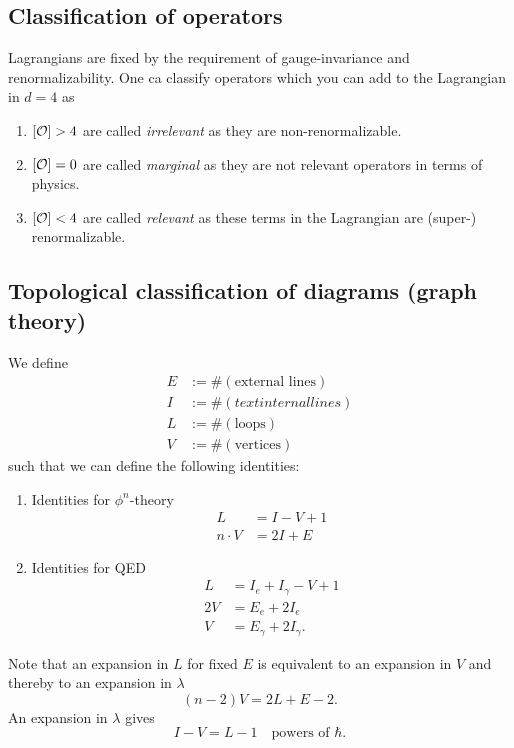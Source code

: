 \subsection{Classification of operators}
Lagrangians are fixed by the requirement of gauge-invariance and renormalizability. One ca classify operators which you can add to the Lagrangian in $d=4$ as
\begin{enumerate}
	\item $[\mathcal{O}] >4$ are called \emph{irrelevant} as they are non-renormalizable.
	\item $[\mathcal{O}] =0$ are called \emph{marginal} as they are not relevant operators in terms of physics.
	\item $[\mathcal{O}]<4$ are called \emph{relevant} as these terms in the Lagrangian are (super-) renormalizable.
\end{enumerate}
\subsection{Topological classification of diagrams (graph theory)}
\begin{mybox}{}
	We define
	\begin{align}
		E&:= \#(\text{external lines})\\
		I&:= \#(text{internal lines})\\
		L&:=\#(\text{loops}) \\
		V&:=\#(\text{vertices})
	\end{align}
such that we can define the following identities:
\begin{enumerate}
\item Identities for $\phi^n$-theory
\begin{align}
L&=I-V+1 \\ 
n \cdot V &= 2I+E 
\end{align}
\item Identities for QED
\begin{align}
	L&=I_e+I_\gamma -V+1 \\
	2V&= E_e + 2I_e \\
	V&= E_\gamma + 2 I_\gamma.
\end{align}
\end{enumerate}
\end{mybox}
Note that an expansion in $L$ for fixed $E$ is equivalent to an expansion in $V$ and thereby to an expansion in $\lambda$
\begin{equation}
	(n-2)V=2L+E-2.
\end{equation}
An expansion in $\lambda$ gives
\begin{equation}
	I-V = L-1 \quad \text{powers of } \hbar.
\end{equation}







